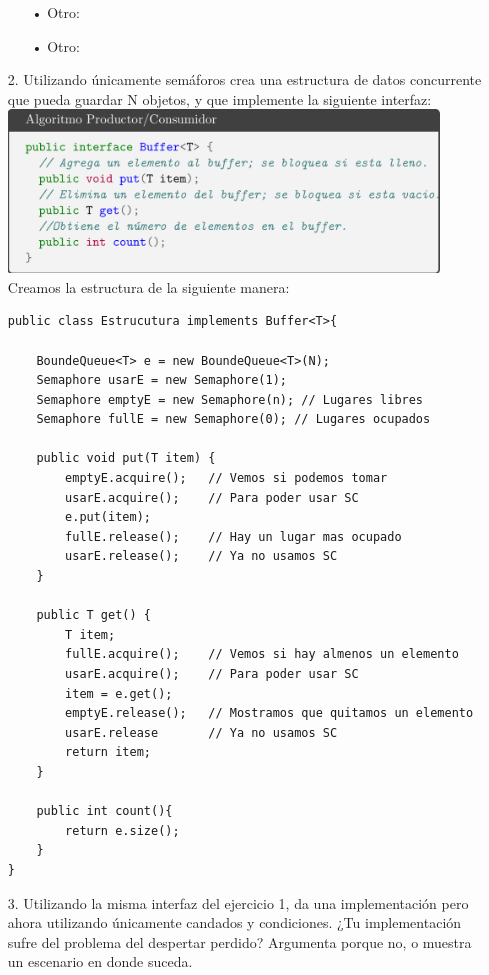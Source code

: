 \documentclass[12pt, letterpaper]{article}
\begin{document}
\begin{itemize}
\begin{itemize}
\item[• ] Otro:

\item[• ] Otro:

\end{itemize}


\item[2. ] Utilizando únicamente semáforos crea una estructura de datos concurrente que
pueda guardar N objetos, y que implemente la siguiente interfaz:\\

\includegraphics[width=0.9\textwidth]{dos.png}\\
Creamos la estructura de la siguiente manera:
\begin{lstlisting}
public class Estrucutura implements Buffer<T>{

    BoundeQueue<T> e = new BoundeQueue<T>(N);
    Semaphore usarE = new Semaphore(1);
    Semaphore emptyE = new Semaphore(n); // Lugares libres
    Semaphore fullE = new Semaphore(0); // Lugares ocupados

    public void put(T item) {
        emptyE.acquire();   // Vemos si podemos tomar
        usarE.acquire();    // Para poder usar SC
        e.put(item);    
        fullE.release();    // Hay un lugar mas ocupado
        usarE.release();    // Ya no usamos SC
    }

    public T get() {
        T item;
        fullE.acquire();    // Vemos si hay almenos un elemento
        usarE.acquire();    // Para poder usar SC
        item = e.get();  
        emptyE.release();   // Mostramos que quitamos un elemento
        usarE.release       // Ya no usamos SC
        return item;
    }

    public int count(){
        return e.size();
    }
}
\end{lstlisting}



\item[3. ]Utilizando la misma interfaz del ejercicio 1, da una implementación pero ahora
utilizando únicamente candados y condiciones. ¿Tu implementación sufre del
problema del despertar perdido? Argumenta porque no, o muestra un escenario
en donde suceda.


\end{itemize}
\end{document}
